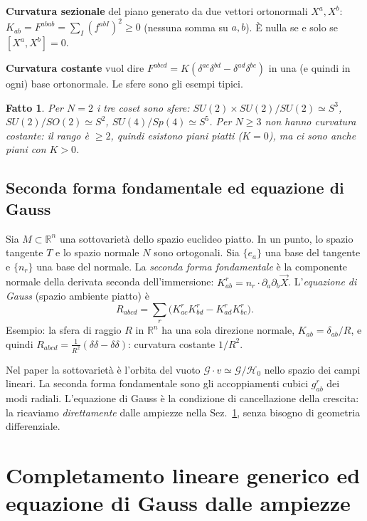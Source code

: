 \documentclass[11pt,a4paper]{article}
\numberwithin{equation}{section}
\newtheorem{fatto}{Fatto}
\theoremstyle{remark}
\newcommand{\G}{\mathcal{G}}
\newcommand{\Hg}{\mathcal{H}_0}
\newcommand{\R}{\mathbb{R}}
\begin{document}
\textbf{Curvatura sezionale} del piano generato da due vettori ortonormali $X^a,X^b$: $K_{ab}=F^{abab}=\sum_I(f^{abI})^2\ge0$ (nessuna somma su $a,b$). È nulla se e solo se $[X^a,X^b]=0$.

\textbf{Curvatura costante} vuol dire $F^{abcd}=K(\delta^{ac}\delta^{bd}-\delta^{ad}\delta^{bc})$ in una (e quindi in ogni) base ortonormale. Le sfere sono gli esempi tipici.

\begin{fatto}
Per $N=2$ i tre coset sono sfere: $SU(2)\times SU(2)/SU(2)\simeq S^3$, $SU(2)/SO(2)\simeq S^2$, $SU(4)/Sp(4)\simeq S^5$. Per $N\ge3$ \emph{non} hanno curvatura costante: il rango è $\ge2$, quindi esistono piani piatti ($K=0$), ma ci sono anche piani con $K>0$.
\end{fatto}

\subsection{Seconda forma fondamentale ed equazione di Gauss}

Sia $M\subset\R^n$ una sottovarietà dello spazio euclideo piatto. In un punto, lo spazio tangente $T$ e lo spazio normale $N$ sono ortogonali. Sia $\{e_a\}$ una base del tangente e $\{n_r\}$ una base del normale. La \emph{seconda forma fondamentale} è la componente normale della derivata seconda dell'immersione: $K^r_{ab}=n_r\cdot\partial_a\partial_b\vec X$. L'\emph{equazione di Gauss} (spazio ambiente piatto) è
\begin{equation}
R_{abcd}=\sum_r\big(K^r_{ac}K^r_{bd}-K^r_{ad}K^r_{bc}\big).
\end{equation}
Esempio: la sfera di raggio $R$ in $\R^{n}$ ha una sola direzione normale, $K_{ab}=\delta_{ab}/R$, e quindi $R_{abcd}=\frac{1}{R^2}(\delta\delta-\delta\delta)$: curvatura costante $1/R^2$. \checkmark

Nel paper la sottovarietà è l'orbita del vuoto $\G\cdot v\simeq\G/\Hg$ nello spazio dei campi lineari. La seconda forma fondamentale sono gli accoppiamenti cubici $g^r_{ab}$ dei modi radiali. L'equazione di Gauss è la condizione di cancellazione della crescita: la ricaviamo \emph{direttamente} dalle ampiezze nella Sez.~\ref{sec:linear}, senza bisogno di geometria differenziale.

\section{Completamento lineare generico ed equazione di Gauss dalle ampiezze}
\label{sec:linear}
\end{document}
